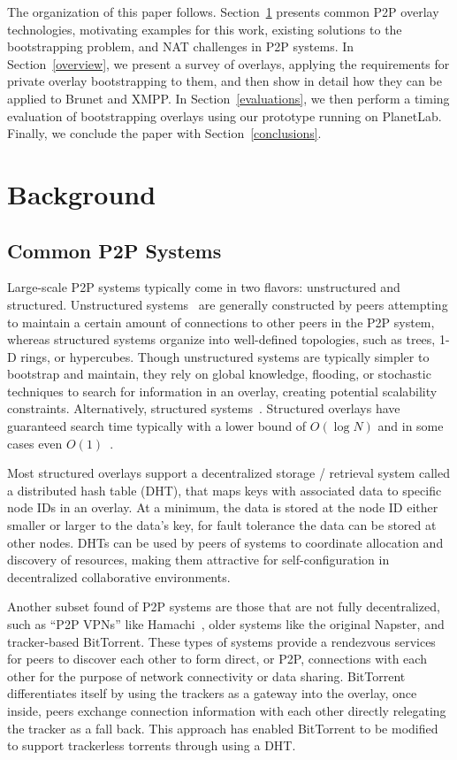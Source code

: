 \documentclass[conference]{IEEEtran}
\begin{document}
The organization of this paper follows.  Section~\ref{background} presents
common P2P overlay technologies, motivating examples for this work, existing
solutions to the bootstrapping problem, and NAT challenges in P2P systems.  In
Section~\ref{overview}, we present a survey of overlays, applying the
requirements for private overlay bootstrapping to them, and then show in detail
how they can be applied to Brunet and XMPP.  In Section~\ref{evaluations}, we
then perform a timing evaluation of bootstrapping overlays using our prototype
running on PlanetLab.  Finally, we conclude the paper with
Section~\ref{conclusions}.

\section{Background}
\label{background}
\subsection{Common P2P Systems}

Large-scale P2P systems typically come in two flavors:  unstructured and
structured.  Unstructured systems~\cite{gnutella, fasttrack} are generally
constructed by peers attempting to maintain a certain amount of connections to
other peers in the P2P system, whereas structured systems organize into
well-defined topologies, such as trees, 1-D rings, or hypercubes.  Though
unstructured systems are typically simpler to bootstrap and maintain, they rely
on global knowledge, flooding, or stochastic techniques to search for
information in an overlay, creating potential scalability constraints.
Alternatively, structured systems~\cite{pastry, chord, symphony, kademlia,
can}.  Structured overlays have guaranteed search time typically with a lower
bound of $O(\log N)$ and in some cases even $O(1)$~\cite{beehive}.

Most structured overlays support a decentralized storage / retrieval system
called a distributed hash table (DHT), that maps keys with associated data to
specific node IDs in an overlay.  At a minimum, the data is stored at the node
ID either smaller or larger to the data's key, for fault tolerance the data can
be stored at other nodes.  DHTs can be used by peers of systems to coordinate
allocation and discovery of resources, making them attractive for
self-configuration in decentralized collaborative environments.

Another subset found of P2P systems are those that are not fully decentralized,
such as ``P2P VPNs'' like Hamachi~\cite{hamachi}, older systems like the
original Napster, and tracker-based BitTorrent.  These types of systems provide
a rendezvous services for peers to discover each other to form direct, or P2P,
connections with each other for the purpose of network connectivity or data
sharing.  BitTorrent differentiates itself by using the trackers as a gateway
into the overlay, once inside, peers exchange connection information with each
other directly relegating the tracker as a fall back.  This approach has
enabled BitTorrent to be modified to support trackerless torrents through using
a DHT.
\end{document}

